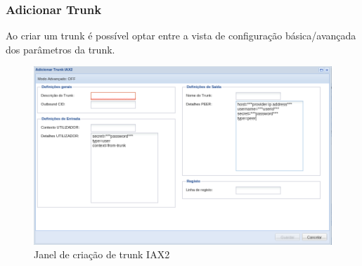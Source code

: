 \subsubsection{Adicionar Trunk}
\label{sec:etvoip_pbx_trunks_add}

Ao criar um trunk é possível optar entre a vista de configuração básica/avançada dos parâmetros da trunk.

\begin{figure}[H]
        \begin{center}
        \includegraphics[scale=0.4]{screenshots/etvoip_pbx_trunks_iax.png}
        \caption{Janel de criação de trunk IAX2}
        \label{fig:etvoip_pbx_trunks_iax}
        \end{center}
\end{figure}


